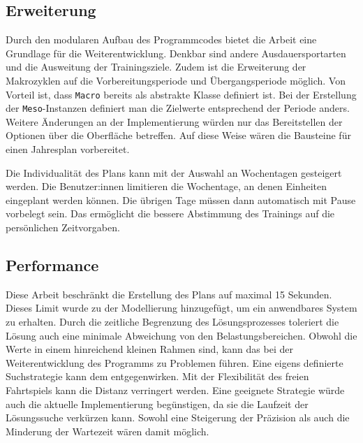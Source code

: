 \subsection{Erweiterung} 
Durch den modularen Aufbau des Programmcodes bietet die Arbeit eine Grundlage für die Weiterentwicklung. Denkbar sind andere Ausdauersportarten und die Ausweitung der Trainingsziele. Zudem ist die Erweiterung der Makrozyklen auf die Vorbereitungsperiode und Übergangsperiode möglich. Von Vorteil ist, dass \texttt{Macro} bereits als abstrakte Klasse definiert ist. Bei der Erstellung der \texttt{Meso}-Instanzen definiert man die Zielwerte entsprechend der Periode anders. Weitere Änderungen an der Implementierung würden nur das Bereitstellen der Optionen über die Oberfläche betreffen. Auf diese Weise wären die Bausteine für einen Jahresplan vorbereitet.\par
Die Individualität des Plans kann mit der Auswahl an Wochentagen gesteigert werden. Die Benutzer:innen limitieren die Wochentage, an denen Einheiten eingeplant werden können. Die übrigen Tage müssen dann automatisch mit Pause vorbelegt sein. Das ermöglicht die bessere Abstimmung des Trainings auf die persönlichen Zeitvorgaben.
    
\subsection{Performance}
Diese Arbeit beschränkt die Erstellung des Plans auf maximal 15 Sekunden. Dieses Limit wurde zu der Modellierung hinzugefügt, um ein anwendbares System zu erhalten. Durch die zeitliche Begrenzung des Lösungsprozesses toleriert die Lösung auch eine minimale Abweichung von den Belastungsbereichen. Obwohl die Werte in einem hinreichend kleinen Rahmen sind, kann das bei der Weiterentwicklung des Programms zu Problemen führen. \newline
Eine eigens definierte Suchstrategie kann dem entgegenwirken. Mit der Flexibilität des freien Fahrtspiels kann die Distanz verringert werden. Eine geeignete Strategie würde auch die aktuelle Implementierung begünstigen, da sie die Laufzeit der Lösungssuche verkürzen kann. Sowohl eine Steigerung der Präzision als auch die Minderung der Wartezeit wären damit möglich.

